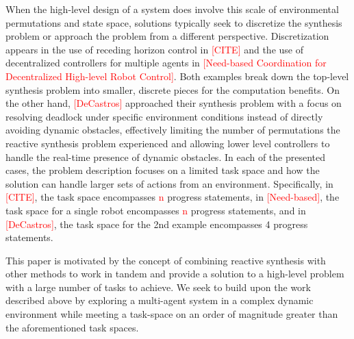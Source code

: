 \documentclass[journal]{IEEEtran}
\begin{document}
When the high-level design of a system does involve this scale of environmental permutations and state space, solutions typically seek to discretize the synthesis problem or approach the problem from a different perspective. Discretization appears in the use of receding horizon control in \textcolor{red}{[CITE]} and the use of decentralized controllers for multiple agents in \textcolor{red}{[Need-based Coordination for Decentralized High-level Robot Control]}. Both examples break down the top-level synthesis problem into smaller, discrete pieces for the computation benefits. On the other hand, \textcolor{red}{[DeCastros]} approached their synthesis problem with a focus on resolving deadlock under specific environment conditions instead of directly avoiding dynamic obstacles, effectively limiting the number of permutations the reactive synthesis problem experienced and allowing lower level controllers to handle the real-time presence of dynamic obstacles. In each of the presented cases, the problem description focuses on a limited task space and how the solution can handle larger sets of actions from an environment. Specifically, in \textcolor{red}{[CITE]}, the task space encompasses \textcolor{red}{n} progress statements, in \textcolor{red}{[Need-based]}, the task space for a single robot encompasses \textcolor{red}{n} progress statements, and in \textcolor{red}{[DeCastros]}, the task space for the 2nd example encompasses 4 progress statements. 

This paper is motivated by the concept of combining reactive synthesis with other methods to work in tandem and provide a solution to a high-level problem with a large number of tasks to achieve. We seek to build upon the work described above by exploring a multi-agent system in a complex dynamic environment while meeting a task-space on an order of magnitude greater than the aforementioned task spaces. 
\end{document}
